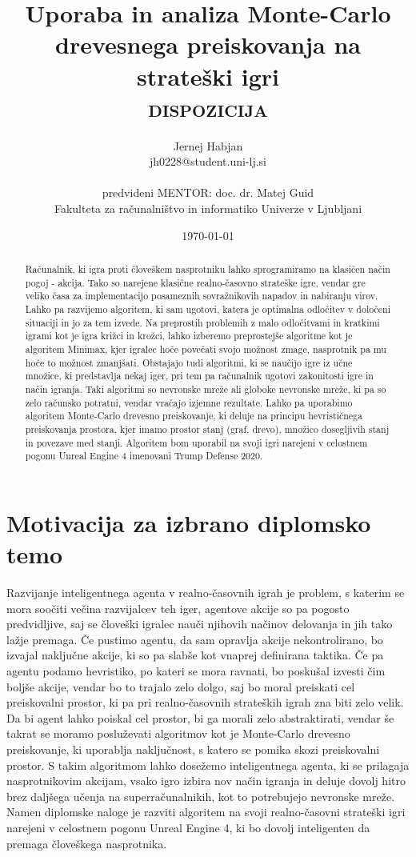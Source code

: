 \documentclass[11pt,a4paper]{article}
\title{Uporaba in analiza Monte-Carlo drevesnega preiskovanja na strateški igri\\
\textsc{dispozicija}}
\author{Jernej Habjan\\
jh0228@student.uni-lj.si\\
\ \\
predvideni MENTOR: doc. dr. Matej Guid \\
Fakulteta za računalništvo in informatiko Univerze v Ljubljani
\date{\today}         
}
\begin{document}
\maketitle

\begin{abstract}
Računalnik, ki igra proti človeškem nasprotniku lahko sprogramiramo na klasičen način pogoj - akcija. Tako so narejene klasične realno-časovno strateške igre, vendar gre veliko časa za implementacijo posameznih sovražnikovih napadov in nabiranju virov.
Lahko pa razvijemo algoritem, ki sam ugotovi, katera je optimalna odločitev v določeni situaciji in jo za tem izvede.
Na preprostih problemih z malo odločitvami in kratkimi igrami kot je igra križci in krožci, lahko izberemo preprostejše algoritme kot je algoritem Minimax, kjer igralec hoče povečati svojo možnost zmage, nasprotnik pa mu hoče to možnost zmanjšati.
Obstajajo tudi algoritmi, ki se naučijo igre iz učne množice, ki predstavlja nekaj iger, pri tem pa računalnik ugotovi zakonitosti igre in način igranja.
Taki algoritmi so nevronske mreže ali globoke nevronske mreže, ki pa so zelo računsko potratni, vendar vračajo izjemne rezultate. 
Lahko pa uporabimo algoritem Monte-Carlo drevesno preiskovanje, ki deluje na principu hevrističnega preiskovanja prostora, kjer imamo prostor stanj (graf, drevo), množico dosegljivih stanj in povezave med stanji.
Algoritem bom uporabil na svoji igri narejeni v celostnem pogonu Unreal Engine 4 imenovani Trump Defense 2020.
\end{abstract}


\section{Motivacija za izbrano diplomsko temo}

Razvijanje inteligentnega agenta v realno-časovnih igrah je problem, s katerim se mora soočiti večina razvijalcev teh iger, agentove akcije so pa pogosto predvidljive, saj se človeški igralec nauči njihovih načinov delovanja in jih tako lažje premaga.
Če pustimo agentu, da sam opravlja akcije nekontrolirano, bo izvajal naključne akcije, ki so pa slabše kot vnaprej definirana taktika.
Če pa agentu podamo hevristiko, po kateri se mora ravnati, bo poskušal izvesti čim boljše akcije, vendar bo to trajalo zelo dolgo, saj bo moral preiskati cel preiskovalni prostor, ki pa pri realno-časovnih strateških igrah zna biti zelo velik.
Da bi agent lahko poiskal cel prostor, bi ga morali zelo abstraktirati, vendar še takrat se moramo posluževati algoritmov kot je Monte-Carlo drevesno preiskovanje, ki uporablja naključnost, s katero se pomika skozi preiskovalni prostor.
S takim algoritmom lahko dosežemo inteligentnega agenta, ki se prilagaja nasprotnikovim akcijam, vsako igro izbira nov način igranja in deluje dovolj hitro brez daljšega učenja na superračunalnikih, kot to potrebujejo nevronske mreže.
Namen diplomske naloge je razviti algoritem na svoji realno-časovni strateški igri narejeni v celostnem pogonu Unreal Engine 4, ki bo dovolj inteligenten da premaga človeškega nasprotnika.
\end{document}
